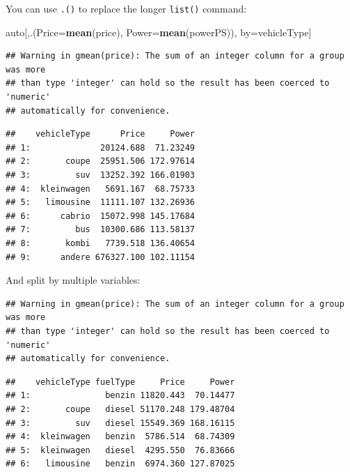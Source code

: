 \documentclass[]{book}
\newenvironment{Shaded}{\begin{snugshade}}{\end{snugshade}}
\newcommand{\DataTypeTok}[1]{\textcolor[rgb]{0.13,0.29,0.53}{#1}}
\newcommand{\KeywordTok}[1]{\textcolor[rgb]{0.13,0.29,0.53}{\textbf{#1}}}
\newcommand{\NormalTok}[1]{#1}
\newcommand{\OperatorTok}[1]{\textcolor[rgb]{0.81,0.36,0.00}{\textbf{#1}}}
\newcommand{\StringTok}[1]{\textcolor[rgb]{0.31,0.60,0.02}{#1}}
\theoremstyle{definition}
\theoremstyle{definition}
\theoremstyle{definition}
\theoremstyle{remark}
\begin{document}
You can use \texttt{.()} to replace the longer \texttt{list()} command:

\begin{Shaded}
\begin{Highlighting}[]
\NormalTok{auto[,.(}\DataTypeTok{Price=}\KeywordTok{mean}\NormalTok{(price), }\DataTypeTok{Power=}\KeywordTok{mean}\NormalTok{(powerPS)), by=vehicleType]}
\end{Highlighting}
\end{Shaded}

\begin{verbatim}
## Warning in gmean(price): The sum of an integer column for a group was more
## than type 'integer' can hold so the result has been coerced to 'numeric'
## automatically for convenience.
\end{verbatim}

\begin{verbatim}
##    vehicleType      Price     Power
## 1:              20124.688  71.23249
## 2:       coupe  25951.506 172.97614
## 3:         suv  13252.392 166.01903
## 4:  kleinwagen   5691.167  68.75733
## 5:   limousine  11111.107 132.26936
## 6:      cabrio  15072.998 145.17684
## 7:         bus  10300.686 113.58137
## 8:       kombi   7739.518 136.40654
## 9:      andere 676327.100 102.11154
\end{verbatim}

And split by multiple variables:

\begin{Shaded}
\end{Shaded}

\begin{verbatim}
## Warning in gmean(price): The sum of an integer column for a group was more
## than type 'integer' can hold so the result has been coerced to 'numeric'
## automatically for convenience.
\end{verbatim}

\begin{verbatim}
##    vehicleType fuelType     Price     Power
## 1:               benzin 11820.443  70.14477
## 2:       coupe   diesel 51170.248 179.48704
## 3:         suv   diesel 15549.369 168.16115
## 4:  kleinwagen   benzin  5786.514  68.74309
## 5:  kleinwagen   diesel  4295.550  76.83666
## 6:   limousine   benzin  6974.360 127.87025
\end{verbatim}
\end{document}
